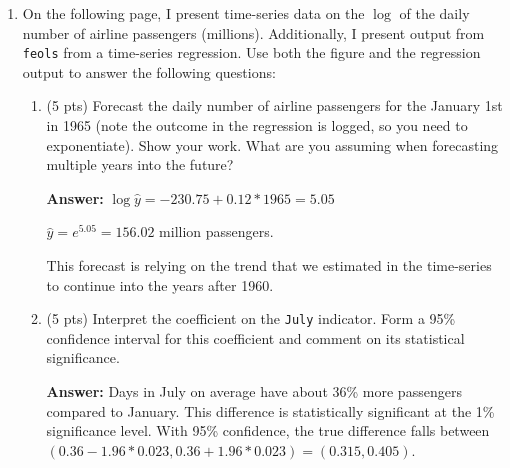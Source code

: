 \documentclass[12pt]{article}
\newcommand{\answer}[1]{{\color{blue_winged_teal}\textbf{Answer:} #1}}
\newcommand{\pts}[1]{{\color{zinc500}(#1 pts)}}
\begin{document}
\begin{enumerate}
\begin{enumerate}
    \item \pts{5} Suppose the company wants to test whether the new training intervention has had a statistically significant impact on customer sentiment.
    Describe a time-series regression you could run to test if there is a statistically significant jump in responses after the intervention.
    Describe the hypothesis test you would use after running this regression.

    \answer{
      To test for a significant jump in average score after the intervention, the time-series regression should add an indicator for the post-period ($t > $ the intervention date) along with other useful time-series terms to predict systematic patterns.
      Then, a test that the coefficient on the post indicator can test for a statistically significant jump after the intervention date.
    }
  \end{enumerate}


  \newpage
  \item On the following page, I present time-series data on the $\log$ of the daily number of airline passengers (millions).
  Additionally, I present output from \texttt{feols} from a time-series regression.
  Use both the figure and the regression output to answer the following questions:

  \begin{enumerate}
    \item \pts{5} Forecast the daily number of airline passengers for the January 1st in 1965 (note the outcome in the regression is logged, so you need to exponentiate). Show your work. What are you assuming when forecasting multiple years into the future?

    \answer{
      $\log{\hat{y}} = -230.75 + 0.12 * 1965 = 5.05$

      $\hat{y} = e^{5.05} = 156.02$ million passengers.

      This forecast is relying on the trend that we estimated in the time-series to continue into the years after 1960.
    }

    \item \pts{5} Interpret the coefficient on the \texttt{July} indicator. Form a 95\% confidence interval for this coefficient and comment on its statistical significance.

    \answer{
      Days in July on average have about 36\% more passengers compared to January.
      This difference is statistically significant at the 1\% significance level.
      With 95\% confidence, the true difference falls between $(0.36 - 1.96 * 0.023, 0.36 + 1.96 * 0.023) = (0.315, 0.405)$.
    }


\end{enumerate}
\end{enumerate}
\end{document}
